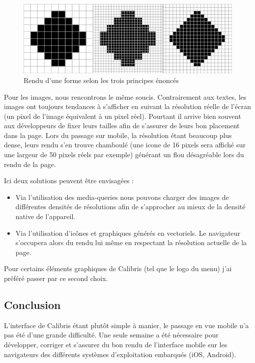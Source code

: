 \documentclass[12pt,a4paper]{book}
\begin{document}
\begin{figure}[htp]
\centering
\includegraphics[scale=0.9]{img/reso1.png}
 \caption{Rendu d'une forme selon les trois principes énoncés}
 \label{fig.jira_agile1}
\end{figure}

Pour les images, nous rencontrons le même soucis. Contrairement aux textes, les images ont toujours tendances à s'afficher en suivant la résolution réelle de l'écran (un pixel de l'image équivalent à un pixel réel). Pourtant il arrive bien souvent aux développeurs de fixer leurs tailles afin de s'assurer de leurs bon placement dans la page. Lors du passage sur mobile, la résolution étant beaucoup plus dense, leurs rendu s'en trouve chamboulé (une icone de 16 pixels sera affiché sur une largeur de 50 pixels réels par exemple) générant un flou désagréable lors du rendu de la page.

Ici deux solutions peuvent être envisagées :
\begin{itemize}
  \item Via l'utilisation des media-queries nous pouvons charger des images de différentes densités de résolutions afin de s'approcher au mieux de la densité native de l'appareil. 
  \item Via l'utilisation d'icônes et graphiques générés en vectoriels. Le navigateur s'occupera alors du rendu lui même en respectant la résolution actuelle de la page.
\end{itemize}

Pour certains éléments graphiques de Calibris (tel que le logo du menu) j'ai préféré passer par ce second choix.

\subsection*{Conclusion}

L'interface de Calibris étant plutôt simple à manier, le passage en vue mobile n'a pas été d'une grande difficulté. Une seule semaine a été nécessaire pour développer, corriger et s'assurer du bon rendu de l'interface mobile sur les navigateurs des différents systèmes d'exploitation embarqués (iOS, Android).
\end{document}
